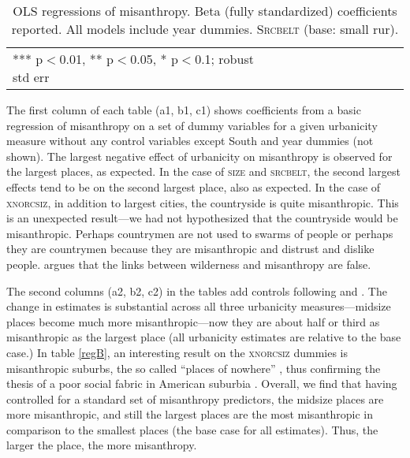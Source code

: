 \documentclass[11pt, letterpaper]{article}
\begin{document}
\begin{spacing}{1.4}
\begin{table}[h!]\centering
\caption{OLS regressions  of misanthropy. Beta (fully standardized) coefficients
  reported. All models include year dummies. \textsc{Srcbelt} (base: small rur).} \label{regC}
\begin{scriptsize} \begin{tabular}{p{1.8in}p{.45in}p{.45in}p{.45in}p{.45in}p{.45in}p{.45in}p{.45in}p{.45in}p{.45in}p{.45 in}}\hline

\hline  *** p$<$0.01, ** p$<$0.05, * p$<$0.1; robust std err
\end{tabular}\end{scriptsize}\end{table}

The first column of each table (a1, b1, c1) shows coefficients from a basic
regression of misanthropy on a set of dummy variables for a given urbanicity
measure without any control variables except South and year  dummies (not shown). 
The largest negative effect of urbanicity on misanthropy is observed for the largest
places, as expected. In the case of \textsc{size} and \textsc{srcbelt}, the second largest effects tend to be on the second largest place, also as expected.  In
the case of \textsc{xnorcsiz}, in addition to largest cities,  the countryside is quite
misanthropic. This is an unexpected result---we had not hypothesized that the countryside would be misanthropic. Perhaps countrymen are not used to swarms of people or
perhaps they are countrymen because they are misanthropic and distrust and
dislike people. \citet{keeling13} argues that the links between wilderness and misanthropy are false. 

The second columns (a2, b2, c2) in the tables add controls following
\citet{welch07} and \citet{smith97}.
 The change in  estimates is substantial across all three urbanicity
 measures---midsize places become much more misanthropic---now they are about
 half or third as misanthropic as the largest place (all urbanicity estimates
 are relative to the base case.) 
 In table \ref{regB}, an interesting result on the
\textsc{xnorcsiz} dummies is misanthropic suburbs, the so called ``places of
nowhere'' \citep{kunstler12}, thus confirming the thesis of 
 a poor social fabric in American suburbia \citep{duany01,kunstler12,kay97}.
Overall,
 we find that having controlled for a standard set of misanthropy predictors, the midsize places are more misanthropic, and still the
 largest places are the most misanthropic in comparison to the smallest
 places (the base case for all estimates).
Thus, the larger the place, the more misanthropy. 


\end{spacing}
\end{document}
